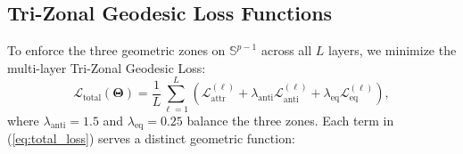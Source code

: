 \documentclass[journal]{IEEEtran}
\begin{document}
\subsection{Tri-Zonal Geodesic Loss Functions}
To enforce the three geometric zones on $\mathbb{S}^{p-1}$ across all $L$ layers, we minimize the multi-layer Tri-Zonal Geodesic Loss:
\begin{equation}
\mathcal{L}_{\text{total}}(\boldsymbol{\Theta}) = \frac{1}{L}\sum_{\ell=1}^{L} \left( \mathcal{L}_{\text{attr}}^{(\ell)} + \lambda_{\text{anti}}\mathcal{L}_{\text{anti}}^{(\ell)} + \lambda_{\text{eq}}\mathcal{L}_{\text{eq}}^{(\ell)} \right),
\label{eq:total_loss}
\end{equation}
where $\lambda_{\text{anti}} = 1.5$ and $\lambda_{\text{eq}} = 0.25$ balance the three zones. Each term in (\ref{eq:total_loss}) serves a distinct geometric function:
\end{document}
